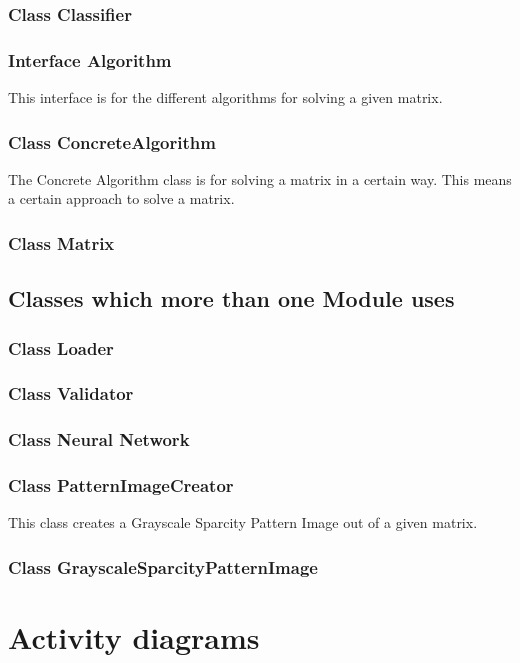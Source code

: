 \documentclass[parskip=full]{scrartcl}
\begin{document}
\subsubsection{Class Classifier}
\subsubsection{Interface Algorithm}
This interface is for the different algorithms for solving a given matrix.
\subsubsection{Class ConcreteAlgorithm}
The Concrete Algorithm class is for solving a matrix in a certain way.
This means a certain approach to solve a matrix.
\subsubsection{Class Matrix}
\subsection{Classes which more than one Module uses}
\subsubsection{Class Loader}

\subsubsection{Class Validator}

\subsubsection{Class Neural Network}

\subsubsection{Class PatternImageCreator}
This class creates a Grayscale Sparcity Pattern Image out of a given matrix.
\subsubsection{Class GrayscaleSparcityPatternImage}

\section{Activity diagrams}
\end{document}
